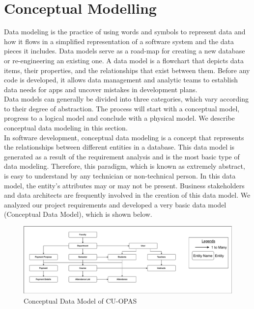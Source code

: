\section{Conceptual Modelling}\label{sec:cm}

Data modeling is the practice of using words and symbols to represent data and how it flows in a simplified representation of a software system and the data pieces it includes. Data models serve as a road-map for creating a new database or re-engineering an existing one. A data model is a flowchart that depicts data items, their properties, and the relationships that exist between them. Before any code is developed, it allows data management and analytic teams to establish data needs for apps and uncover mistakes in development plans.\\
Data models can generally be divided into three categories, which vary according to their degree of abstraction. The process will start with a conceptual model, progress to a logical model and conclude with a physical model. We describe conceptual data modeling in this section.\\

In software development, conceptual data modeling is a concept that represents the relationships between different entities in a database. This data model is generated as a result of the requirement analysis and is the most basic type of data modeling. Therefore, this paradigm, which is known as extremely abstract, is easy to understand by any technician or non-technical person. In this data model, the entity's attributes may or may not be present. Business stakeholders and data architects are frequently involved in the creation of this data model. 
We analyzed our project requirements and developed a very basic data model (Conceptual Data Model), which is shown below.

\begin{figure}[H]
    \centering
    \includegraphics[width=1\textwidth]{images/conceptual}
    \caption{Conceptual Data Model of CU-OPAS}
    \label{fig:conceptual}
\end{figure}
